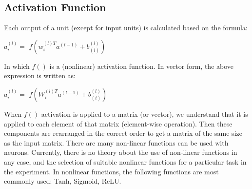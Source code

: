 \subsection{Activation Function}
Each output of a unit (except for input units) is calculated based on the formula:
\begin{center}
	$a_{i}^{(l)} = $ $f(w_{i}^{(l)T}a^{(l-1)} + b_{(i)}^{(l)} )$
\end{center}
In which $f()$ is a (nonlinear) activation function. In vector form, the above expression is written as:
\begin{center}
	$a_{i}^{(l)} = $ $f(W_{i}^{(l)T}a^{(l-1)} + b_{(i)}^{(l)} )$
\end{center}
When $f()$ activation is applied to a matrix (or vector), we understand that it is applied to each element of that matrix (element-wise operation). Then these components are rearranged in the correct order to get a matrix of the same size as the input matrix.
There are many non-linear functions can be used with neurons. Currently, there is no theory about the use of non-linear functions in any case, and the selection of suitable nonlinear functions for a particular task in the experiment. In nonlinear functions, the following functions are most commonly used: Tanh, Sigmoid, ReLU.
